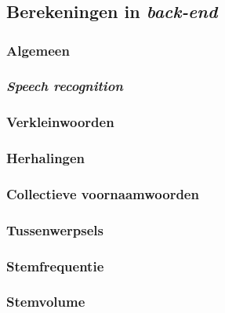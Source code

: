 
\chapter{}
\label{ch:methodologie}


\section{Berekeningen in \textit{back-end}}

\subsection{Algemeen}
\subsection{\textit{Speech recognition}}
\subsection{Verkleinwoorden}
\subsection{Herhalingen}
\subsection{Collectieve voornaamwoorden}
\subsection{Tussenwerpsels}
\subsection{Stemfrequentie}
\subsection{Stemvolume}


